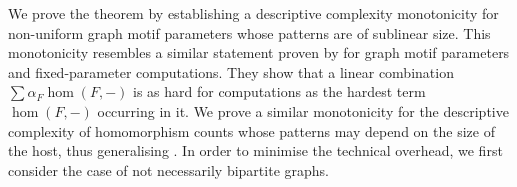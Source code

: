 \documentclass[11pt, DIV=15]{scrarticle}
\theoremstyle{definition}
\theoremstyle{plain}
\theoremstyle{remark}
\begin{document}
	We prove the theorem by establishing a descriptive complexity monotonicity for non-uniform graph motif parameters whose patterns are of sublinear size. 
	This monotonicity resembles a similar statement proven by \textcite{curticapean_homomorphisms_2017}
	for graph motif parameters and fixed-parameter computations. 
	They show that a linear combination $\sum \alpha_F \hom(F, -)$ is as hard for  computations as the hardest term $\hom(F, -)$ occurring in it.
	We prove a similar monotonicity for the descriptive complexity of homomorphism counts whose patterns may depend on the size of the host, thus
	generalising \cite[Lemma~6]{seppelt_logical_2024}.
	In order to minimise the technical overhead,
	we first consider the case of not necessarily bipartite graphs.
	
	
	
	
\end{document}
